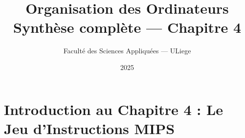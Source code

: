 \documentclass[12pt]{article}
\title{Organisation des Ordinateurs\\\large Synthèse complète — Chapitre 4}
\author{Faculté des Sciences Appliquées — ULiege}
\date{2025}
\begin{document}
\maketitle

\tableofcontents

\newpage

\section{Introduction au Chapitre 4 : Le Jeu d’Instructions MIPS}

\end{document}
